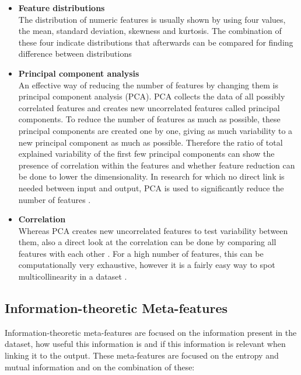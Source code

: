 \documentclass[10pt,a4paper]{report}
\begin{document}
	\begin{itemize}
		\item \textbf{Feature distributions} \\
		The distribution of numeric features is usually shown by using four values, the mean, standard deviation, skewness and kurtosis. The combination of these four indicate distributions that afterwards can be compared for finding difference between distributions
		\item \textbf{Principal component analysis} \\
		An effective way of reducing the number of features by changing them is principal component analysis (PCA). PCA collects the data of all possibly correlated features and creates new uncorrelated features called principal components. To reduce the number of features as much as possible, these principal components are created one by one, giving as much variability to a new principal component as much as possible. Therefore the ratio of total explained variability of the first few principal components can show the presence of correlation within the features and whether feature reduction can be done to lower the dimensionality. In research for which no direct link is needed between input and output, PCA is used to significantly reduce the number of features \cite{wold1987principal}.
		\item \textbf{Correlation} \\
		Whereas PCA creates new uncorrelated features to test variability between them, also a direct look at the correlation can be done by comparing all features with each other \cite{yu2003feature}. For a high number of features, this can be computationally very exhaustive, however it is a fairly easy way to spot multicollinearity in a dataset \cite{hall2000correlation}.
		
	\end{itemize}
	
	\subsection{Information-theoretic Meta-features}
	\label{subsec:InformationTheoreticMF}
	
	Information-theoretic meta-features are focused on the information present in the dataset, how useful this information is and if this information is relevant when linking it to the output. These meta-features are focused on the entropy and mutual information and on the combination of these:
	
\end{document}
